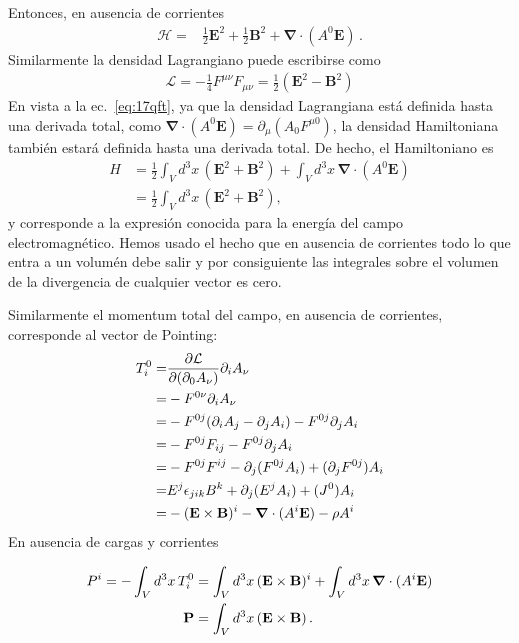 Entonces, en ausencia de corrientes
\begin{align}
  \mathcal{H}=&\frac{1}{2}\mathbf{E}^2+\frac{1}{2}\mathbf{B}^2+\boldsymbol{\nabla}\cdot(A^0\mathbf{E})\,.
\end{align}
Similarmente la densidad Lagrangiano puede escribirse como
\begin{align}
   \mathcal{L}=-\frac{1}{4}F^{\mu\nu}F_{\mu\nu}=\frac{1}{2}\left(\mathbf{E}^2-\mathbf{B}^2\right)
\end{align}
En vista a la ec.~\eqref{eq:17qft}, ya que la densidad Lagrangiana está definida hasta una derivada total, como $\boldsymbol{\nabla}\cdot(A^0\mathbf{E})=\partial_\mu(A_0F^{\mu0})$, la densidad Hamiltoniana también estará definida hasta una derivada total. De hecho,
el Hamiltoniano es 
\begin{align}
  H&=\frac{1}{2}\int_Vd^3x\,(\mathbf{E}^2+\mathbf{B}^2)+ \int_Vd^3x\,\boldsymbol{\nabla}\cdot(A^0\mathbf{E})\nonumber\\
  \label{eq:18qft}
  &=\frac{1}{2}\int_Vd^3x\,(\mathbf{E}^2+\mathbf{B}^2),
\end{align}
y corresponde a la expresión conocida para la energía del campo electromagnético. Hemos usado el hecho que en ausencia de corrientes todo lo que entra a un volumén debe salir y por consiguiente las integrales sobre el volumen de la divergencia de cualquier vector es cero.

Similarmente el momentum total del
campo, en ausencia de corrientes, corresponde al vector de Pointing:
\begin{align}
  T^0_i=&\frac{\partial\mathcal{L}}{\partial(\partial_0 A_\nu)}\partial_i A_\nu\nonumber\\
  =&-F^{0\nu}\partial_i A_\nu\nonumber\\
  =&-F^{0j}(\partial_i A_j-\partial_j A_i)-F^{0j}\partial_j A_i\nonumber\\
  =&-F^{0j}F_{ij}-F^{0j}\partial_j A_i\nonumber\\
  =&-F^{0j}F^{ij}-\partial_j (F^{0j}A_i)+(\partial_jF^{0j}) A_i\nonumber\\
  =&E^{j}\epsilon_{jik}B^k+\partial_j (E^jA_i)+(J^0) A_i\nonumber\\
  =&-(\mathbf{E}\times \mathbf{B})^i-\boldsymbol{\nabla}\cdot(A^i\mathbf{E})-\rho A^i\,
\end{align}
En ausencia de cargas y corrientes

\begin{align}
 P^i=-\int_Vd^3x\,T_{i}^0&=\int_Vd^3x\,(\mathbf{E}\times \mathbf{B})^i+\int_Vd^3x\,\boldsymbol{\nabla}\cdot(A^i\mathbf{E})\nonumber\\
 \label{eq:19qft}
 \mathbf{P}&=\int_Vd^3x\,(\mathbf{E}\times \mathbf{B})\,.
\end{align}

